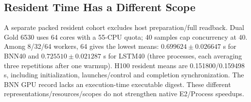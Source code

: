 \subsection{Resident Time Has a Different Scope}
A separate packed resident cohort excludes host preparation/full readback. Dual Gold 6530 uses 64 cores with a 55-CPU quota; 40 samples cap concurrency at 40. Among 8/32/64 workers, 64 gives the lowest means: $0.699624\pm0.026647$ s for BNN40 and $0.725510\pm0.021287$ s for LSTM40 (three processes, each averaging three repetitions after one warmup). H100 resident means are 0.151800/0.159498 s, including initialization, launches/control and completion synchronization. The BNN GPU record lacks an execution-time executable digest. These different representations/resources/scopes do not strengthen native E2/Process speedups.
